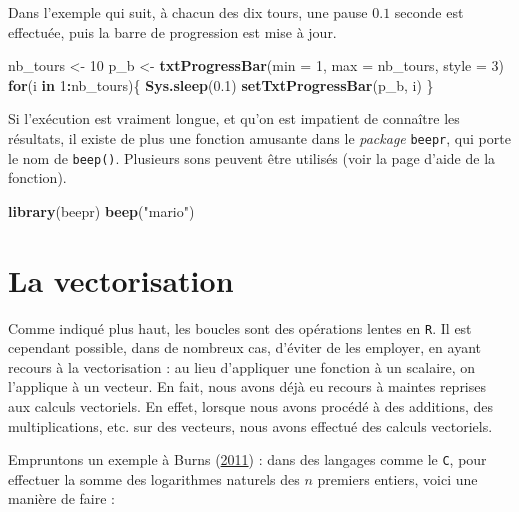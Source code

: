 \documentclass[
  11pt,
]{book}
\newenvironment{Shaded}{\begin{snugshade}}{\end{snugshade}}
\newcommand{\ControlFlowTok}[1]{\textcolor[rgb]{0.13,0.29,0.53}{\textbf{#1}}}
\newcommand{\DataTypeTok}[1]{\textcolor[rgb]{0.13,0.29,0.53}{#1}}
\newcommand{\DecValTok}[1]{\textcolor[rgb]{0.00,0.00,0.81}{#1}}
\newcommand{\FloatTok}[1]{\textcolor[rgb]{0.00,0.00,0.81}{#1}}
\newcommand{\KeywordTok}[1]{\textcolor[rgb]{0.13,0.29,0.53}{\textbf{#1}}}
\newcommand{\NormalTok}[1]{#1}
\newcommand{\OperatorTok}[1]{\textcolor[rgb]{0.81,0.36,0.00}{\textbf{#1}}}
\newcommand{\StringTok}[1]{\textcolor[rgb]{0.31,0.60,0.02}{#1}}
\numberwithin{equation}{section}
\numberwithin{countremarque}{section}
\begin{document}
Dans l'exemple qui suit, à chacun des dix tours, une pause \(0.1\) seconde est effectuée, puis la barre de progression est mise à jour.

\begin{Shaded}
\begin{Highlighting}[]
\NormalTok{nb\_tours \textless{}{-}}\StringTok{ }\DecValTok{10}
\NormalTok{p\_b \textless{}{-}}\StringTok{ }\KeywordTok{txtProgressBar}\NormalTok{(}\DataTypeTok{min =} \DecValTok{1}\NormalTok{, }\DataTypeTok{max =}\NormalTok{ nb\_tours, }\DataTypeTok{style =} \DecValTok{3}\NormalTok{)}
\ControlFlowTok{for}\NormalTok{(i }\ControlFlowTok{in} \DecValTok{1}\OperatorTok{:}\NormalTok{nb\_tours)\{}
  \KeywordTok{Sys.sleep}\NormalTok{(}\FloatTok{0.1}\NormalTok{)}
  \KeywordTok{setTxtProgressBar}\NormalTok{(p\_b, i)}
\NormalTok{\}}
\end{Highlighting}
\end{Shaded}

Si l'exécution est vraiment longue, et qu'on est impatient de connaître les résultats, il existe de plus une fonction amusante dans le \emph{package} \texttt{beepr}, qui porte le nom de \texttt{beep()}. Plusieurs sons peuvent être utilisés (voir la page d'aide de la fonction).

\begin{Shaded}
\begin{Highlighting}[]
\KeywordTok{library}\NormalTok{(beepr)}
\KeywordTok{beep}\NormalTok{(}\StringTok{"mario"}\NormalTok{)}
\end{Highlighting}
\end{Shaded}

\hypertarget{boucles_vectorisation}{%
\section{La vectorisation}\label{boucles_vectorisation}}

Comme indiqué plus haut, les boucles sont des opérations lentes en \texttt{R}. Il est cependant possible, dans de nombreux cas, d'éviter de les employer, en ayant recours à la vectorisation : au lieu d'appliquer une fonction à un scalaire, on l'applique à un vecteur. En fait, nous avons déjà eu recours à maintes reprises aux calculs vectoriels. En effet, lorsque nous avons procédé à des additions, des multiplications, etc. sur des vecteurs, nous avons effectué des calculs vectoriels.

Empruntons un exemple à Burns (\protect\hyperlink{ref-Burns_2011_R}{2011}) : dans des langages comme le \texttt{C}, pour effectuer la somme des logarithmes naturels des \(n\) premiers entiers, voici une manière de faire :
\end{document}
